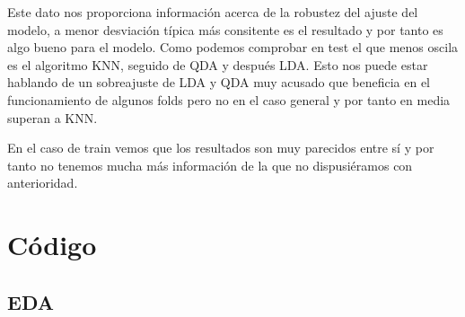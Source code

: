 \documentclass[12pt,a4paper]{article}
\begin{document}
Este dato nos proporciona información acerca de la robustez del ajuste del modelo, a menor desviación típica más consitente es el resultado y por tanto es algo bueno para el modelo. Como podemos comprobar en test el que menos oscila es el algoritmo KNN, seguido de QDA y después LDA. Esto nos puede estar hablando de un sobreajuste de LDA y QDA muy acusado que beneficia en el funcionamiento de algunos folds pero no en el caso general y por tanto en media superan a KNN.

En el caso de train vemos que los resultados son muy parecidos entre sí y por tanto no tenemos mucha más información de la que no dispusiéramos con anterioridad.

\section{Código}

\subsection{EDA}
\end{document}
